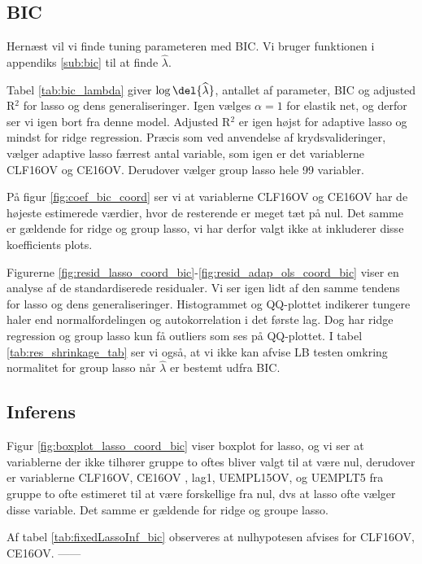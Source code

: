 \subsection{BIC}
Hernæst vil vi finde tuning parameteren med BIC. 
Vi bruger funktionen i appendiks \ref{sub:bic} til at finde $\widehat{\lambda}$. 

Tabel \ref{tab:bic_lambda} giver $\log \del{ \widehat\lambda}$, antallet af parameter, BIC og adjusted R$^2$ for lasso og dens generaliseringer. 
Igen vælges \(\alpha = 1\) for elastik net, og derfor ser vi igen bort fra denne model.
Adjusted R$^2$ er igen højst for adaptive lasso og mindst for ridge regression. 
Præcis som ved anvendelse af krydsvalideringer, vælger adaptive lasso færrest antal variable, som igen er det variablerne \textcolor{blue3}{CLF16OV} og \textcolor{blue3}{CE16OV}.
Derudover vælger group lasso hele 99 variabler. 



På figur \ref{fig:coef_bic_coord} ser vi at variablerne \textcolor{blue3}{CLF16OV} og \textcolor{blue3}{CE16OV} har de højeste estimerede værdier, hvor de resterende er meget tæt på nul. 
Det samme er gældende for ridge og group lasso, vi har derfor valgt ikke at inkluderer disse koefficients plots. 


Figurerne \ref{fig:resid_lasso_coord_bic}-\ref{fig:resid_adap_ols_coord_bic} viser en analyse af de standardiserede residualer.
Vi ser igen lidt af den samme tendens for lasso og dens generaliseringer. 
Histogrammet og QQ-plottet indikerer tungere haler end normalfordelingen og autokorrelation i det første lag. 
Dog har ridge regression og group lasso kun få outliers som ses på QQ-plottet. 
I tabel \ref{tab:res_shrinkage_tab} ser vi også, at vi ikke kan afvise LB testen omkring normalitet for group lasso når $\widehat{\lambda}$ er bestemt udfra BIC. 

\newpage
\subsection*{Inferens}
Figur \ref{fig:boxplot_lasso_coord_bic} viser boxplot for lasso, og vi ser at variablerne der ikke tilhører gruppe to oftes bliver valgt til at være nul, derudover er variablerne  \textcolor{blue3}{CLF16OV},  \textcolor{blue3}{CE16OV} , \textcolor{blue3}{lag1}, \textcolor{blue3}{UEMPL15OV}, og \textcolor{blue3}{UEMPLT5} fra gruppe to ofte estimeret til at være forskellige fra nul, dvs at lasso ofte vælger disse variable. 
Det samme er gældende for ridge og groupe lasso. 

Af tabel \ref{tab:fixedLassoInf_bic} observeres at nulhypotesen afvises for \textcolor{blue3}{CLF16OV}, \textcolor{blue3}{CE16OV}. ------




